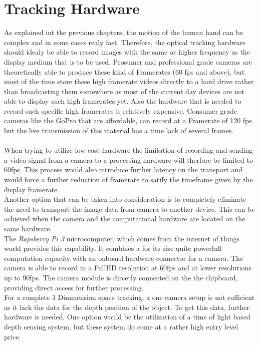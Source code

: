 \section{Tracking Hardware}
 As explained int the previous chapters, the motion of the human hand can be complex and in some cases realy fast. Therefore, the optical tracking hardware should idealy be able to record images with the same or higher frequency as the display medium that is to be used. Prosumer and professional grade cameras are theoretically able to produce these kind of Framerates (60 fps and above), but most of the time store these high framerate videos directly to a hard drive rather than broadcasting them somewhere as most of the current day devices are not able to display such high framerates yet. Also the hardware that is needed to record such specific high framerates is relatively expensive. Consumer grade cameras like the GoPro that are affordable, can record at a Framerate of 120 fps but the live transmission of this material has a time lack of several frames.\\
\\When trying to utilize low cost hardware the limitation of recording and sending a video signal from a camera to a processing hardware will therfore be limited to 60fps. This process would also introduce further latency on the transport and would force a further reduction of framerate to satify the timeframe given by the display framerate.
\\Another option that can be taken into consideration is to completely eliminate the need to transport the image data from camera to another device. This can be achieved when the camera and the computational hardware are located on the same hardware.\\The \textit{Rapsberry Pi 3} microcomputer, which comes from the internet of things world provides this capability. It combines a for its size quite powerfull computation capacity with an onboard hardware connector for a camera. The camera is able to record in a FullHD resolution at 60fps and at lower resolutions up to 90fps. The camera module is dircetly connected on the the chipboard, providing direct access for further processing.\\
For a complete 3 Dimmension space tracking, a one camera setup is not sufficient as it lack the data for the depth position of the object. To get this data, further hardware is needed. One option would be the utilization of a time of light based depth sensing system, but these system do come at a rather high entry level price.
